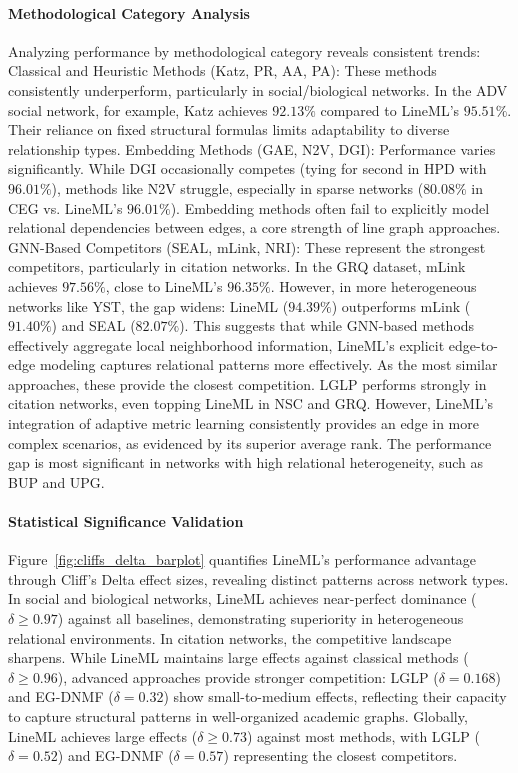 \documentclass[pdflatex,sn-mathphys-num]{sn-jnl}%
\theoremstyle{thmstyleone}%
\theoremstyle{thmstyletwo}%
\theoremstyle{thmstylethree}%
\theoremstyle{plain} %
\theoremstyle{definition} %
\theoremstyle{remark} %
\theoremstyle{plain} %
\begin{document}
\paragraph{Methodological Category Analysis}
Analyzing performance by methodological category reveals consistent trends:
Classical and Heuristic Methods (Katz, PR, AA, PA): These methods consistently underperform, particularly in social/biological networks. 
In the ADV social network, for example, Katz achieves $92.13\%$ compared to LineML's $95.51\%$. 
Their reliance on fixed structural formulas limits adaptability to diverse relationship types.
Embedding Methods (GAE, N2V, DGI): Performance varies significantly. While DGI occasionally competes (tying for second in HPD with $96.01\%$), methods like N2V struggle, especially in sparse networks ($80.08\%$ in CEG vs. LineML's $96.01\%$). 
Embedding methods often fail to explicitly model relational dependencies between edges, a core strength of line graph approaches.
{GNN-Based Competitors (SEAL, mLink, NRI)}: These represent the strongest competitors, particularly in citation networks. 
In the GRQ dataset, mLink achieves $97.56\%$, close to LineML's $96.35\%$. 
However, in more heterogeneous networks like YST, the gap widens: LineML ($94.39\%$) outperforms mLink ($91.40\%$) and SEAL ($82.07\%$). 
This suggests that while GNN-based methods effectively aggregate local neighborhood information, LineML's explicit edge-to-edge modeling captures relational patterns more effectively.
As the most similar approaches, these provide the closest competition. 
LGLP performs strongly in citation networks, even topping LineML in NSC and GRQ. 
However, LineML's integration of adaptive metric learning consistently provides an edge in more complex scenarios, as evidenced by its superior average rank. 
The performance gap is most significant in networks with high relational heterogeneity, such as BUP and UPG.



\paragraph{Statistical Significance Validation}
Figure~\ref{fig:cliffs_delta_barplot} quantifies LineML's performance advantage through Cliff's Delta effect sizes, revealing distinct patterns across network types. 
In social and biological networks, LineML achieves near-perfect dominance ($\delta \geq 0.97$) against all baselines, demonstrating superiority in heterogeneous relational environments.
In citation networks, the competitive landscape sharpens. 
While LineML maintains large effects against classical methods ($\delta \geq 0.96$), advanced approaches provide stronger competition: LGLP ($\delta = 0.168$) and EG-DNMF ($\delta = 0.32$) show small-to-medium effects, reflecting their capacity to capture structural patterns in well-organized academic graphs.
Globally, LineML achieves large effects ($\delta \geq 0.73$) against most methods, with LGLP ($\delta = 0.52$) and EG-DNMF ($\delta = 0.57$) representing the closest competitors. 
\end{document}

